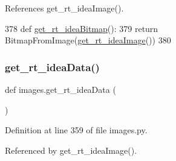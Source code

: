 References get\+\_\+rt\+\_\+idea\+Image().


\begin{DoxyCode}
378 \textcolor{keyword}{def }\hyperlink{namespaceimages_a3da1175f8c1f38ab38d6f68b3355bd50}{get\_rt\_ideaBitmap}():
379     \textcolor{keywordflow}{return} BitmapFromImage(\hyperlink{namespaceimages_a476483666934d1a89f0b20cc805d5ed7}{get\_rt\_ideaImage}())
380 
\end{DoxyCode}
\mbox{\label{namespaceimages_a37c278ef96ae60271be822aa05328780}} 
\subsubsection{\texorpdfstring{get\+\_\+rt\+\_\+idea\+Data()}{get\_rt\_ideaData()}}
{\footnotesize\ttfamily def images.\+get\+\_\+rt\+\_\+idea\+Data (\begin{DoxyParamCaption}{ }\end{DoxyParamCaption})}



Definition at line 359 of file images.\+py.



Referenced by get\+\_\+rt\+\_\+idea\+Image().


